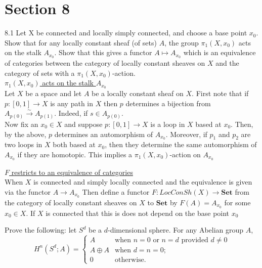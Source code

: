 \newpage
\section*{Section 8}
8.1 Let X be connected and locally simply connected, and choose a base point $x_0$. Show that for any locally constant sheaf (of sets) $A$, the group $\pi_1(X,x_0)$ acts on the stalk $A_{x_0}$. Show that this gives a functor $A \mapsto A_{x_0}$ which is an equivalence of categories between the category of locally constant sheaves on $X$ and the category of sets with a $\pi_1(X,x_0)$-action. \\

\underline{$\pi_1(X,x_0)$ acts on the stalk $A_{x_0}$}\\
Let $X$ be a space and let $A$ be a locally constant sheaf on $X$. First note that if $p:[0,1] \rightarrow X$ is any path in $X$ then $p$ determines a bijection from $A_{p(0)} \xrightarrow{\sim} A_{p(1)}$.  Indeed, if $s \in A_{p(0)}$.\\
Now fix an $x_0 \in X$ and suppose $p:[0,1] \rightarrow X$ is a loop in $X$ based at $x_0$. Then, by the above, $p$ determines an automorphism of $A_{x_0}$. Moreover, if $p_1$ and $p_2$ are two loops in $X$ both based at $x_0$, then they determine the same automorphism of $A_{x_0}$ if they are homotopic. This implies a $\pi_1(X,x_0)$-action on $A_{x_0}$


\underline{$F$ restricts to an equivalence of categories}\\
When $X$ is connected and simply locally connected and the equivalence is given via the functor $A \rightarrow A_{x_0}$
 Then define a functor $F: LocConSh(X) \rightarrow \textbf{Set}$ from the category of locally constant sheaves on $X$ to $\textbf{Set}$ by $F(A) = A_{x_0}$ for some $x_0 \in X$. If $X$ is connected that this is does not depend on the base point $x_0$

 Prove the following: let $S^d$ be a $d$-dimensional sphere. For any Abelian group $A$, 
\[
H^n(S^d;A)= \begin{cases} A & \text{when } n=0 \text{ or } n=d \text{ provided } d \neq 0 \\ A \oplus A & \text{when } d =n=0;\\ 0 & \text{otherwise}.
\end{cases}
\]

